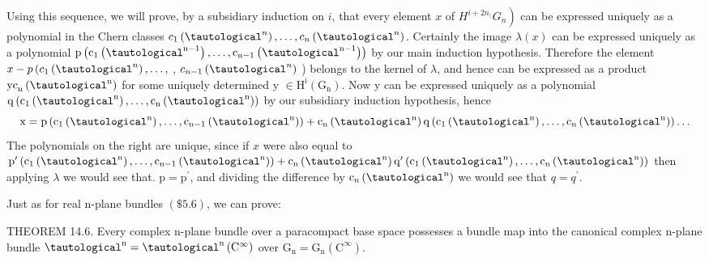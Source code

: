 \documentclass[10pt]{article}
\begin{document}
Using this sequence, we will prove, by a subsidiary induction on $i$, that every element $x$ of $\left.H^{i+2 n_{(}} G_{n}\right)$ can be expressed uniquely as a polynomial in the Chern classes $c_{1}\left(\tautological^{n}\right), \ldots, c_{n}\left(\tautological^{n}\right)$. Certainly the image $\lambda(x)$ can be expressed uniquely as a polynomial $\mathrm{p}\left(\mathrm{c}_{1}\left(\tautological^{\mathrm{n}-1}\right), \ldots, \mathrm{c}_{\mathrm{n}-1}\left(\tautological^{\mathrm{n}-1}\right)\right)$ by our main induction hypothesis. Therefore the element $x-p\left(c_{1}\left(\tautological^{n}\right), \ldots,\right.$, $c_{n-1}\left(\tautological^{n}\right)$ ) belongs to the kernel of $\lambda$, and hence can be expressed as a product $\operatorname{yc}_{\mathrm{n}}\left(\tautological^{\mathrm{n}}\right)$ for some uniquely determined y $\in \mathrm{H}^{\mathrm{i}}\left(\mathrm{G}_{\mathrm{n}}\right)$. Now y can be expressed uniquely as a polynomial $\mathrm{q}\left(\mathrm{c}_{1}\left(\tautological^{\mathrm{n}}\right), \ldots, \mathrm{c}_{\mathrm{n}}\left(\tautological^{\mathrm{n}}\right)\right)$ by our subsidiary induction hypothesis, hence
$$
\mathrm{x}=\mathrm{p}\left(\mathrm{c}_{1}\left(\tautological^{\mathrm{n}}\right), \ldots, \mathrm{c}_{\mathrm{n}-1}\left(\tautological^{\mathrm{n}}\right)\right)+\mathrm{c}_{\mathrm{n}}\left(\tautological^{\mathrm{n}}\right) \mathrm{q}\left(\mathrm{c}_{1}\left(\tautological^{\mathrm{n}}\right), \ldots, \mathrm{c}_{\mathrm{n}}\left(\tautological^{\mathrm{n}}\right)\right) \ldots
$$
The polynomials on the right are unique, since if $x$ were also equal to $\mathrm{p}^{\prime}\left(\mathrm{c}_{1}\left(\tautological^{\mathrm{n}}\right), \ldots, \mathrm{c}_{\mathrm{n}-1}\left(\tautological^{\mathrm{n}}\right)\right)+\mathrm{c}_{\mathrm{n}}\left(\tautological^{\mathrm{n}}\right) \mathrm{q}^{\prime}\left(\mathrm{c}_{1}\left(\tautological^{\mathrm{n}}\right), \ldots, \mathrm{c}_{\mathrm{n}}\left(\tautological^{\mathrm{n}}\right)\right)$ then applying $\lambda$ we would see that. $\mathrm{p}=\mathrm{p}^{\prime}$, and dividing the difference by $\mathrm{c}_{\mathrm{n}}\left(\tautological^{\mathrm{n}}\right)$ we would see that $q=q^{\prime}$.

Just as for real n-plane bundles $(\$ 5.6)$, we can prove:

THEOREM 14.6. Every complex n-plane bundle over a paracompact base space possesses a bundle map into the canonical complex $\mathrm{n}$-plane bundle $\tautological^{\mathrm{n}}=\tautological^{\mathrm{n}}\left(\mathrm{C}^{\infty}\right)$ over $\mathrm{G}_{\mathrm{n}}=\mathrm{G}_{\mathrm{n}}\left(\mathrm{C}^{\infty}\right)$.
\end{document}
